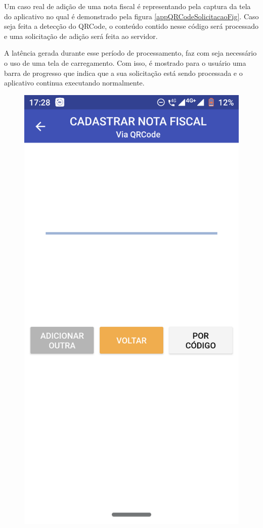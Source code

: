 Um caso real de adição de uma nota fiscal é representando pela captura da tela do aplicativo no qual é demonstrado pela figura \ref{appQRCodeSolicitacaoFig}. Caso seja feita a detecção do QRCode, o conteúdo contido nesse código será processado e uma solicitação de adição será feita ao servidor.

A latência gerada durante esse período de processamento, faz com seja necessário o uso de uma tela de carregamento. Com isso, é mostrado para o usuário uma barra de progresso que indica que a sua solicitação está sendo processada e o aplicativo continua executando normalmente.

\begin{figure}[h]
    \centering
    \includegraphics[scale=0.15]{tcc/figures/app/app_codigo_qrcode_loading.png}

\end{figure}
